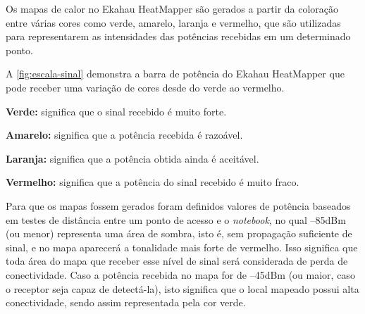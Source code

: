 Os mapas de calor no Ekahau HeatMapper são gerados a partir da coloração entre várias cores como verde, amarelo, laranja e vermelho, que são utilizadas para representarem as intensidades das potências recebidas em um determinado ponto.

A \autoref{fig:escala-sinal} demonstra a barra de potência do Ekahau HeatMapper que pode receber uma variação de cores desde do verde ao vermelho.

\begin{compactitem}
	\item \textbf{Verde:} significa que o sinal recebido é muito forte.
	\item \textbf{Amarelo:} significa que a potência recebida é razoável.
	\item \textbf{Laranja:} significa que a potência obtida ainda é aceitável.
	\item \textbf{Vermelho:} significa que a potência do sinal recebido é muito fraco.
\end{compactitem}

\begin{figure}[H]
	\centering
\end{figure}

Para que os mapas fossem gerados foram definidos valores de potência baseados em testes de distância entre um ponto de acesso e o \textit{notebook}, no qual --85dBm (ou menor) representa uma área de sombra, isto é, sem propagação suficiente de sinal, e no mapa aparecerá a tonalidade mais forte de vermelho. Isso significa que toda área do mapa que receber esse nível de sinal será considerada de perda de conectividade. Caso a potência recebida no mapa for de --45dBm (ou maior, caso o receptor seja capaz de detectá-la), isto significa que o local mapeado possui alta conectividade, sendo assim representada pela cor verde.
